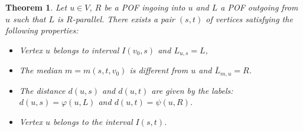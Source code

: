 \documentclass{article}
\newtheorem{theorem}{Theorem}
\begin{document}
\begin{theorem}
Let $u \in V$, $R$ be a POF ingoing into $u$ and $L$ a POF outgoing from $u$ such that $L$ is $R$-parallel. There exists a pair $(s,t)$ of vertices satisfying the following properties:
\begin{itemize}
    \item Vertex $u$ belongs to interval $I(v_0,s)$ and $L_{u,s} = L$,
    \item The median $m = m(s,t,v_0)$ is different from $u$ and $\overline{L}_{m,u} = R$.
    \item The distance $d(u,s)$ and $d(u,t)$ are given by the labels: $d(u,s) = \varphi(u,L)$ and $d(u,t) = \psi(u,R)$.
    \item Vertex $u$ belongs to the interval $I(s,t)$.
\end{itemize}
\label{th:psi_plus_phi}
\end{theorem}
\end{document}
